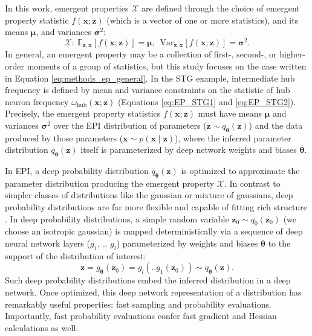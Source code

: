 \documentclass[11pt]{article}
\begin{document}
In this work, emergent properties $\mathcal{X}$ are defined through the choice of emergent property statistic $f(\mathbf{x}; \mathbf{z})$ (which is a vector of one or more statistics), and its means $\bm{\mu}$, and variances $\bm{\sigma}^2$:
 \begin{equation} \label{eq:methods_ep_general}
\mathcal{X}:~ \mathbb{E}_{\mathbf{z},\mathbf{x}}\left[f(\mathbf{x}; \mathbf{z})\right] = \bm{\mu},~~ \text{Var}_{\mathbf{z},\mathbf{x}}\left[f(\mathbf{x}; \mathbf{z})\right] = \bm{\sigma}^2.
\end{equation}
In general, an emergent property may be a collection of first-, second-, or higher-order moments of a group of statistics, but this study focuses on the case written in Equation \ref{eq:methods_ep_general}.
In the STG example, intermediate hub frequency is defined by mean and variance constraints on the statistic of hub neuron frequency $\omega_{\text{hub}}(\mathbf{x}; \mathbf{z})$ (Equations \ref{eq:EP_STG1} and \ref{eq:EP_STG2}).
Precisely, the emergent property statistics $f(\mathbf{x}; \mathbf{z})$ must have means $\bm{\mu}$ and variances $\bm{\sigma}^2$ over the EPI distribution of parameters ($\mathbf{z} \sim q_{\bm{\theta}}(\mathbf{z})$) and the data produced by those parameters ($\mathbf{x} \sim p(\mathbf{x} \mid \mathbf{z})$), where the inferred parameter distribution $q_{\bm{\theta}}(\mathbf{z})$ itself is parameterized by deep network weights and biases $\bm{\theta}$.

In EPI, a deep probability distribution $q_{\bm{\theta}}(\mathbf{z})$ is optimized to approximate the parameter distribution producing the emergent property $\mathcal{X}$.
In contrast to simpler classes of distributions like the gaussian or mixture of gaussians, deep probability distributions are far more flexible and capable of fitting rich structure \cite{rezende2015variational, papamakarios2019normalizing}.
 In deep probability distributions, a simple random variable $\mathbf{z}_0 \sim q_0(\mathbf{z}_0)$ (we choose an isotropic gaussian) is mapped deterministically via a sequence of deep neural network layers ($g_1$, .. $g_l$) parameterized by weights and biases $\bm{\theta}$ to the support of the distribution of interest:
\begin{equation}
\label{eq:deep_transform}
\mathbf{z} = g_{\bm{\theta}}(\mathbf{z}_0) = g_l(..g_1(\mathbf{z}_0)) \sim q_{\bm{\theta}}(\mathbf{z}).
\end{equation}
Such deep probability distributions embed the inferred distribution in a deep network.
Once optimized, this deep network representation of a distribution has remarkably useful properties: fast sampling and probability evaluations.
Importantly, fast probability evaluations confer fast gradient and Hessian calculations as well.
\end{document}
